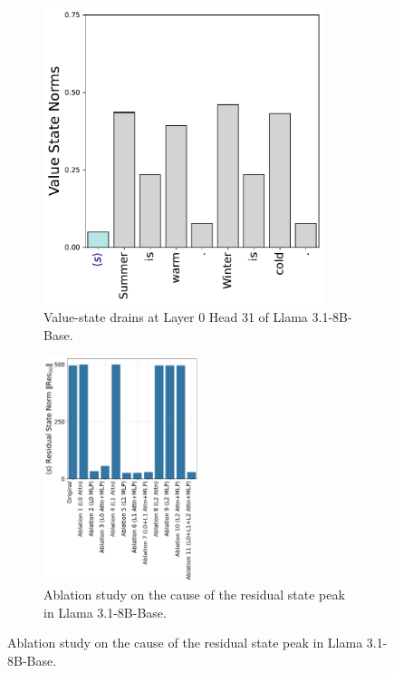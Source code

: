  \begin{figure}[h]
     \centering
     
     \begin{subfigure}[t]{0.3\textwidth}
        \centering
        \caption{Value-state drains at Layer 0 Head 31 of Llama 3.1-8B-Base.}\label{fig:llama_31_value_states}\includegraphics[width=0.9\textwidth]{Figures/llama_31_circuit/demo_val_norms_head_31.pdf}
    \end{subfigure}
    \begin{subfigure}[t]{0.6\textwidth}
    \centering
        \caption{\centering Ablation study on the cause of the residual state peak in Llama 3.1-8B-Base.}\label{fig:llama_31_norms_ablation}\includegraphics[width=0.5\textwidth]{Figures/llama_31_circuit/res_intervention.pdf}
    \end{subfigure}
    

\end{figure}
